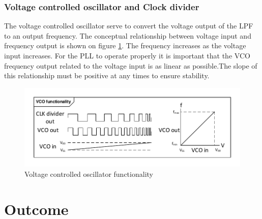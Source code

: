 \subsubsection{Voltage controlled oscillator and Clock divider}
The voltage controlled oscillator serve to convert the voltage output of the LPF to an output frequency. The conceptual relationship between voltage input and frequency output is shown on figure \ref{fig:VCO_func}. The frequency increases as the voltage input increases. For the PLL to operate properly it is important that the VCO frequency output related to the voltage input is as linear as possible.The slope of this relationship must be positive at any times to ensure stability.
\begin{figure}[H]
	\centering
	\includegraphics[width=1\textwidth]{billeder/10technologystudies/VCO_functionality}
	\caption{Voltage controlled oscillator functionality}
	\label{fig:VCO_func}
\end{figure}

\section{Outcome}

